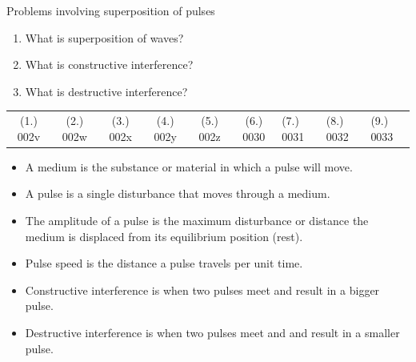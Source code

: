 \begin{exercises}{ Problems involving superposition of pulses }
\begin{enumerate}[noitemsep, label=\textbf{\arabic*}. ]
\begin{figure}[H]
 \end{figure}               \label{m38802*uid62}\item 
          What is superposition of waves?\newline
\label{m38802*uid64}\item What is constructive interference?\newline
\label{m38802*uid65}\item What is destructive interference?\newline
        \end{enumerate}
  \label{m38802*eip-812}
\par \practiceinfo
 \par \begin{tabular}[h]{cccccc}
 (1.) 002v  &  (2.) 002w  &  (3.) 002x  &  (4.) 002y  &  (5.) 002z  &  (6.) 0030  &  (7.) 0031  &  (8.) 0032  &  (9.) 0033  & \end{tabular}

\end{exercises}
            \nopagebreak
            \label{m38802*eip-404}\begin{itemize}[noitemsep]
            \item A medium is the substance or material in which a pulse will move.
	    \item A pulse is a single disturbance that moves through a medium.
	    \item The amplitude of a pulse is the maximum disturbance or distance the medium is displaced from its equilibrium position (rest).
	    \item Pulse speed is the distance a pulse travels per unit time.
	    \item Constructive interference is when two pulses meet and result in a bigger pulse.
	    \item Destructive interference is when two pulses meet and and result in a smaller pulse.
	    \end{itemize}
        \label{m38802*cid9}

